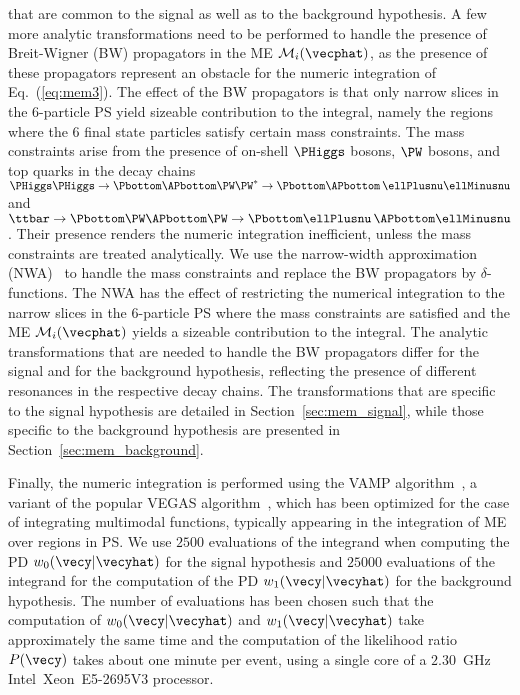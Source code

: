 that are common to the signal as well as to the background hypothesis.
A few more analytic transformations need to be performed to handle the presence of Breit-Wigner (BW) propagators in the ME $\mathcal{M}_{i}(\vecphat)$,
as the presence of these propagators represent an obstacle for the numeric integration of Eq.~(\ref{eq:mem3}).
The effect of the BW propagators is that only narrow slices in the $6$-particle PS yield sizeable contribution to the integral,
namely the regions where the $6$ final state particles satisfy certain mass constraints.
The mass constraints arise from the presence of on-shell $\PHiggs$ bosons, $\PW$ bosons, and top quarks in the decay chains
$\PHiggs\PHiggs \to \Pbottom\APbottom\PW\PW^{\ast} \to \Pbottom\APbottom \, \ellPlusnu\ellMinusnu$ and
$\ttbar \to \Pbottom\PW\APbottom\PW \to \Pbottom\ellPlusnu \, \APbottom\ellMinusnu$.
Their presence renders the numeric integration inefficient, unless the mass constraints are treated analytically. 
We use the narrow-width approximation (NWA)~\cite{NWA} to handle the mass constraints and replace the BW propagators by $\delta$-functions.
The NWA has the effect of restricting the numerical integration to the narrow slices in the $6$-particle PS where the mass constraints are satisfied
and the ME $\mathcal{M}_{i}(\vecphat)$ yields a sizeable contribution to the integral.
The analytic transformations that are needed to handle the BW propagators differ for the signal and for the background hypothesis,
reflecting the presence of different resonances in the respective decay chains.
The transformations that are specific to the signal hypothesis are detailed in Section~\ref{sec:mem_signal},
while those specific to the background hypothesis are presented in Section~\ref{sec:mem_background}.

Finally, the numeric integration is performed using the VAMP algorithm~\cite{VAMP}, a variant of the popular VEGAS algorithm~\cite{VEGAS},
which has been optimized for the case of integrating multimodal functions, typically appearing in the integration of ME over regions in PS.
We use $2500$ evaluations of the integrand when computing the PD $w_{0}(\vecy|\vecyhat)$ for the signal hypothesis 
and $25000$ evaluations of the integrand for the computation of the PD $w_{1}(\vecy|\vecyhat)$ for the background hypothesis.
The number of evaluations has been chosen such that the computation of $w_{0}(\vecy|\vecyhat)$ and $w_{1}(\vecy|\vecyhat)$ take approximately the same time
and the computation of the likelihood ratio $P(\vecy)$ takes about one minute per event,
using a single core of a $2.30$~GHz Intel\TReg~Xeon\TReg~E5-2695V3 processor.


